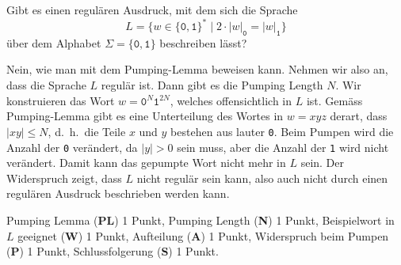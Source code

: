 Gibt es einen regulären Ausdruck, mit dem sich die Sprache
\[
L=\{
w\in\{\texttt{0},\texttt{1}\}^*
\mid
2\cdot|w|_{\texttt{0}}
=
|w|_{\texttt{1}}
\}
\]
über dem Alphabet $\Sigma=\{\texttt{0},\texttt{1}\}$ beschreiben lässt?


\begin{loesung}
Nein, wie man mit dem Pumping-Lemma beweisen kann.
Nehmen wir also an, dass die Sprache $L$ regulär ist.
Dann gibt es die Pumping Length $N$.
Wir konstruieren das Wort $w=\texttt{0}^N\texttt{1}^{2N}$, welches
offensichtlich in $L$ ist.
Gemäss Pumping-Lemma gibt es eine Unterteilung des Wortes in
$w=xyz$ derart, dass $|xy|\le N$, d.~h.~die Teile $x$ und $y$ bestehen
aus lauter \texttt{0}.
Beim Pumpen wird die Anzahl der \texttt{0} verändert, da $|y|>0$ sein
muss, aber die Anzahl der \texttt{1} wird nicht verändert.
Damit kann das gepumpte Wort nicht mehr in $L$ sein.
Der Widerspruch zeigt, dass $L$ nicht regulär sein kann, also auch nicht
durch einen regulären Ausdruck beschrieben werden kann.
\end{loesung}

\begin{bewertung}
Pumping Lemma ({\bf PL}) 1 Punkt,
Pumping Length ({\bf N}) 1 Punkt,
Beispielwort in $L$ geeignet ({\bf W}) 1 Punkt,
Aufteilung ({\bf A}) 1 Punkt,
Widerspruch beim Pumpen ({\bf P}) 1 Punkt,
Schlussfolgerung ({\bf S}) 1 Punkt.
\end{bewertung}

